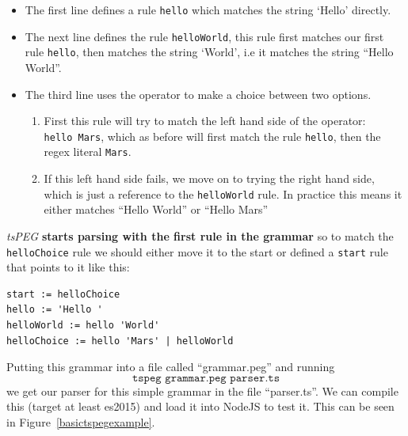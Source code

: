 \begin{itemize}

\item
  The first line defines a rule \texttt{hello} which matches the string
  `Hello' directly.
\item
  The next line defines the rule \texttt{helloWorld}, this rule first
  matches our first rule \texttt{hello}, then matches the string
  `World', i.e it matches the string ``Hello World''.
\item
  The third line uses the \texttt{\textbar{}} operator to make a choice
  between two options.

  \begin{enumerate}
  \def\labelenumi{\arabic{enumi}.}

  \item
    First this rule will try to match the left hand side of the
    operator: \texttt{hello\ \textquotesingle{}Mars\textquotesingle{}},
    which as before will first match the rule \texttt{hello}, then the
    regex literal \texttt{Mars}.
  \item
    If this left hand side fails, we move on to trying the right hand
    side, which is just a reference to the \texttt{helloWorld} rule. In
    practice this means it either matches ``Hello World'' or ``Hello
    Mars''
  \end{enumerate}
\end{itemize}

\emph{tsPEG} \textbf{starts parsing with the first rule in the grammar}
so to match the \texttt{helloChoice} rule we should either move it to
the start or defined a \texttt{start} rule that points to it like this:

\begin{verbatim}
start := helloChoice
hello := 'Hello '
helloWorld := hello 'World'
helloChoice := hello 'Mars' | helloWorld
\end{verbatim}

Putting this grammar into a file called ``grammar.peg'' and running
\[\texttt{tspeg\ grammar.peg\ parser.ts}\]
we get our parser for this simple
grammar in the file ``parser.ts''. We can compile this (target at least
es2015) and load it into NodeJS to test it. This can be seen in Figure~\ref{basictspegexample}.


